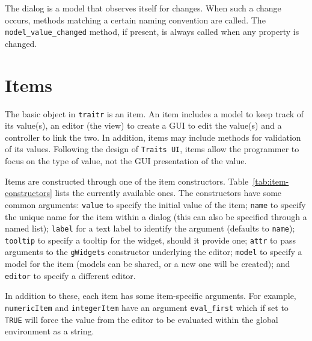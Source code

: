 \documentclass{article}
\newcommand{\code}[1]{\texttt{#1}} %
\newcommand{\function}[1]{\code{#1}} %
\newcommand{\constructor}[1]{\function{#1}\index{#1}}
\newcommand{\args}[1]{\code{#1}} %
\newcommand{\pkg}[1]{\texttt{#1}}
\begin{document}
The dialog is a model that observes itself for changes. When such a
change occurs, methods matching a certain naming convention are
called. The \code{model\_value\_changed} method, if present, is always
called when any property is changed.


\section{Items}
\label{sec:items}
The basic object in \pkg{traitr} is an item. An item includes a model
to keep track of its value(s), an editor (the view) to create a GUI to edit the
value(s) and a controller to link the two. In addition, items may
include methods for validation of its values. Following the design of
\code{Traits UI}, items allow the programmer to focus on the type of
value, not the GUI presentation of the value.

Items are constructed through one of the item
constructors. Table~\ref{tab:item-constructors} lists the currently
available ones. The constructors have some common arguments:
\args{value} to specify the initial value of the item; \args{name}
to specify the unique name for the item within a dialog (this can also
be specified through a named list); \args{label} for a text label to
identify the argument (defaults to \args{name}); \args{tooltip} to
specify a tooltip for the widget, should it provide one; \args{attr}
to pass arguments to the \pkg{gWidgets} constructor underlying the
editor; \args{model} to specify a model for the item (models can be
shared, or a new one will be created); and \args{editor} to specify a
different editor.

In addition to these, each item has some item-specific arguments. For
example, \constructor{numericItem} and \constructor{integerItem} have an argument
\args{eval\_first} which if set to \code{TRUE} will force the value
from the editor to be evaluated within the global environment as a string.
\end{document}
